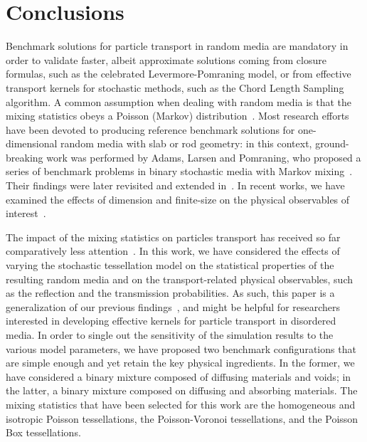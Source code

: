 \documentclass[final,authoryear,5p,times,twocolumn]{elsarticle}
\begin{document}
\section{Conclusions}
\label{conclusions}

Benchmark solutions for particle transport in random media are mandatory in order to validate faster, albeit approximate solutions coming from closure formulas, such as the celebrated Levermore-Pomraning model, or from effective transport kernels for stochastic methods, such as the Chord Length Sampling algorithm. A common assumption when dealing with random media is that the mixing statistics obeys a Poisson (Markov) distribution~\cite{pomraning}. Most research efforts have been devoted to producing reference benchmark solutions for one-dimensional random media with slab or rod geometry: in this context, ground-breaking work was performed by Adams, Larsen and Pomraning, who proposed a series of benchmark problems in binary stochastic media with Markov mixing~\cite{benchmark_adams}. Their findings were later revisited and extended in~\cite{brantley_benchmark, brantley_conf, brantley_conf_2, vasques_suite2}. In recent works, we have examined the effects of dimension and finite-size on the physical observables of interest~\cite{larmier_benchmark, larmier}.

The impact of the mixing statistics on particles transport has received so far comparatively less attention~\cite{renewal}. In this work, we have considered the effects of varying the stochastic tessellation model on the statistical properties of the resulting random media and on the transport-related physical observables, such as the reflection and the transmission probabilities. As such, this paper is a generalization of our previous findings~\citep{larmier_benchmark, larmier}, and might be helpful for researchers interested in developing effective kernels for particle transport in disordered media. In order to single out the sensitivity of the simulation results to the various model parameters, we have proposed two benchmark configurations that are simple enough and yet retain the key physical ingredients. In the former, we have considered a binary mixture composed of diffusing materials and voids; in the latter, a binary mixture composed on diffusing and absorbing materials. The mixing statistics that have been selected for this work are the homogeneous and isotropic Poisson tessellations, the Poisson-Voronoi tessellations, and the Poisson Box tessellations.
\end{document}
